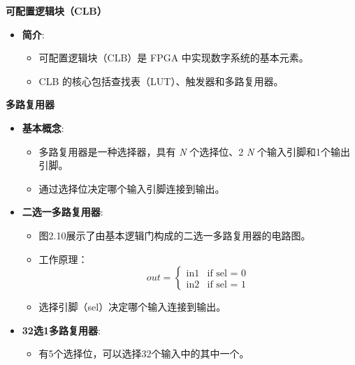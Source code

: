 \documentclass[
  ignorenonframetext,
  chinese,
]{beamer}
\providecommand{\tightlist}{%
  \setlength{\itemsep}{0pt}\setlength{\parskip}{0pt}}
\begin{document}
\begin{frame}[fragile]
\begin{block}{\textbf{可配置逻辑块（CLB）}}
\label{ux53efux914dux7f6eux903bux8f91ux5757clb}
\begin{itemize}
\tightlist
\item
  \textbf{简介}:

  \begin{itemize}
  \tightlist
  \item
    可配置逻辑块（CLB）是 FPGA 中实现数字系统的基本元素。
  \item
    CLB 的核心包括查找表（LUT）、触发器和多路复用器。
  \end{itemize}
\end{itemize}

\begin{block}{\textbf{多路复用器}}
\label{ux591aux8defux590dux7528ux5668}
\begin{itemize}
\tightlist
\item
  \textbf{基本概念}:

  \begin{itemize}
  \tightlist
  \item
    多路复用器是一种选择器，具有 \emph{N} 个选择位、2 \emph{N}
    个输入引脚和1个输出引脚。
  \item
    通过选择位决定哪个输入引脚连接到输出。
  \end{itemize}
\item
  \textbf{二选一多路复用器}:

  \begin{itemize}
  \tightlist
  \item
    图2.10展示了由基本逻辑门构成的二选一多路复用器的电路图。
  \item
    工作原理：
    \[out = \begin{cases} \text{in1} & \text{if sel = 0} \\ \text{in2} & \text{if sel = 1} \end{cases} \tag{2.4}\]
  \item
    选择引脚（sel）决定哪个输入连接到输出。
  \end{itemize}
\item
  \textbf{32选1多路复用器}:

  \begin{itemize}
  \tightlist
  \item
    有5个选择位，可以选择32个输入中的其中一个。
  \end{itemize}
\end{itemize}


\end{block}
\end{block}
\end{frame}
\end{document}
